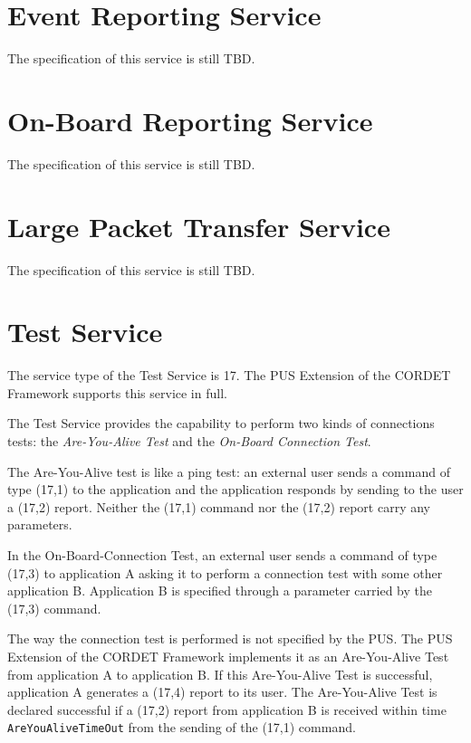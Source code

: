 \documentclass[a4paper,10pt]{article}
\let\stdsection\section
\renewcommand\section{\newpage\stdsection}
\begin{document}
\section{Event Reporting Service}\label{sec:serv5}
The specification of this service is still TBD.

\section{On-Board Reporting Service}\label{sec:serv12}
The specification of this service is still TBD.


\section{Large Packet Transfer Service}\label{sec:serv13}
The specification of this service is still TBD.


\section{Test Service}\label{sec:serv17}
The service type of the Test Service is 17. The PUS Extension of the CORDET Framework supports this service in full.

The Test Service provides the capability to perform two kinds of connections tests: the \textit{Are-You-Alive Test} and the \textit{On-Board Connection Test}.

The Are-You-Alive test is like a ping test: an external user sends a command of type (17,1) to the application and the application responds by sending to the user a (17,2) report. Neither the (17,1) command nor the (17,2) report carry any parameters. 

In the On-Board-Connection Test, an external user sends a command of type (17,3) to application A asking it to perform a connection test with some other application B. Application B is specified through a parameter carried by the (17,3) command. 

The way the connection test is performed is not specified by the PUS. The PUS Extension of the CORDET Framework implements it as an Are-You-Alive Test from application A to application B. If this Are-You-Alive Test is successful, application A generates a (17,4) report to its user. The Are-You-Alive Test is declared successful if a (17,2) report from application B is received within time \texttt{AreYouAliveTimeOut} from the sending of the (17,1) command.
\end{document}
